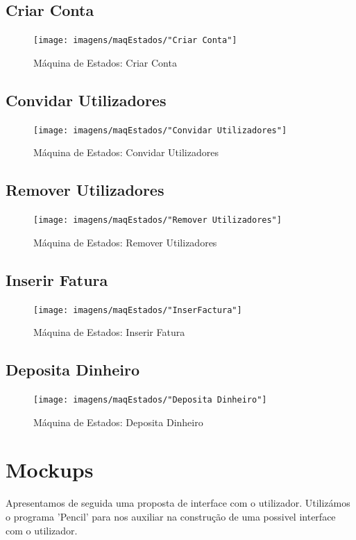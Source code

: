 \subsection{Criar Conta}
\begin{figure}[htb!]
	\centering
	\texttt{[image: imagens/maqEstados/"Criar Conta"]}  
	\caption{Máquina de Estados: Criar Conta}  
\end{figure}

\newpage

\subsection{Convidar Utilizadores}
\begin{figure}[htb!]
	\centering
	\texttt{[image: imagens/maqEstados/"Convidar Utilizadores"]}  
	\caption{Máquina de Estados: Convidar Utilizadores}  
\end{figure}

\subsection{Remover Utilizadores}
\begin{figure}[htb!]
	\centering
	\texttt{[image: imagens/maqEstados/"Remover Utilizadores"]}  
	\caption{Máquina de Estados: Remover Utilizadores}  
\end{figure}

\newpage

\subsection{Inserir Fatura}
\begin{figure}[htb!]
	\centering
	\texttt{[image: imagens/maqEstados/"InserFactura"]}  
	\caption{Máquina de Estados: Inserir Fatura}  
\end{figure}

\subsection{Deposita Dinheiro}
\begin{figure}[htb!]
	\centering
	\texttt{[image: imagens/maqEstados/"Deposita Dinheiro"]}  
	\caption{Máquina de Estados: Deposita Dinheiro}  
\end{figure}

\newpage
\section{Mockups}
Apresentamos de seguida uma proposta de interface com o utilizador. Utilizámos o programa 'Pencil' para nos auxiliar na construção de uma possivel interface com o utilizador. 


